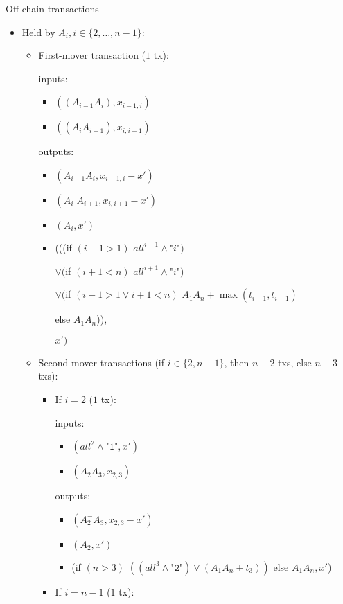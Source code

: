 \begin{notitlebox}{Off-chain transactions}
\begin{itemize}
    \item Held by $A_i, i \in \{2, \dots, n-1\}$:

    \begin{itemize}
      \item First-mover transaction ($1$ tx):

      inputs:
      \begin{itemize}
        \item $((A_{i-1} A_i), x_{i-1,i})$
        \item $((A_i A_{i+1}), x_{i,i+1})$
      \end{itemize}
      outputs:
      \begin{itemize}
        \item $(A_{i-1}^- A_i, x_{i-1,i} - x')$
        \item $(A_i^- A_{i+1}, x_{i,i+1} - x')$
        \item $(A_i, x')$
        \item (((if $(i-1 > 1)$ $\mathit{all}^{i-1} \wedge
        \texttt{"}i\texttt{"})$

        $\vee ($if $(i+1 < n)$ $\mathit{all}^{i+1} \wedge
        \texttt{"}i\texttt{"})$

        $\vee ($if $(i-1 > 1 \vee i+1 < n)$ $A_1 A_n+\max{(t_{i-1}, t_{i+1})}$

        \:\:\: else $A_1 A_n$)),

        $x')$
      \end{itemize}
      \item Second-mover transactions (if $i \in \{2, n-1\}$, then $n-2$ txs,
      else $n-3$ txs):
      \begin{itemize}
        \item If $i = 2$ ($1$ tx):

        inputs:
        \begin{itemize}
          \item $(\mathit{all}^2 \wedge \texttt{"1"}, x')$
          \item $(A_2 A_3, x_{2,3})$
        \end{itemize}
        outputs:
        \begin{itemize}
          \item $(A_2^- A_3, x_{2,3} - x')$
          \item $(A_2, x')$
          \item (if $(n > 3)$ $((\mathit{all}^{3} \wedge \texttt{"2"}) \vee
          (A_1 A_n + t_3))$ else $A_1 A_n, x'$)
        \end{itemize}
        \item If $i = n-1$ ($1$ tx):


\end{itemize}
\end{itemize}
\end{itemize}
\end{notitlebox}
